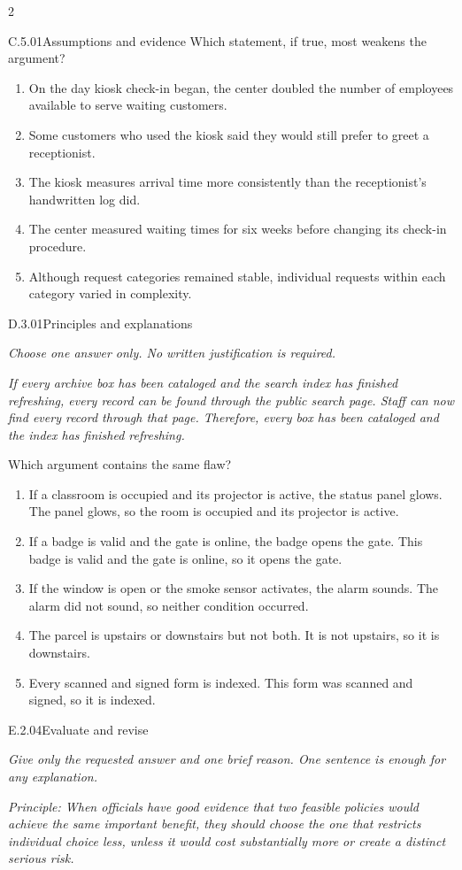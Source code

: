 \documentclass[9pt]{extarticle}
\newcommand{\choice}[1]{\item #1}
\begin{document}
\begin{multicols}{2}
\begin{DenseCoreProblem}{C.5.01}{Assumptions and evidence}
Which statement, if true, most weakens the argument?
\begin{enumerate}[label=(\alph*)]
  \choice{On the day kiosk check-in began, the center doubled the number of employees available to serve waiting customers.}
  \choice{Some customers who used the kiosk said they would still prefer to greet a receptionist.}
  \choice{The kiosk measures arrival time more consistently than the receptionist's handwritten log did.}
  \choice{The center measured waiting times for six weeks before changing its check-in procedure.}
  \choice{Although request categories remained stable, individual requests within each category varied in complexity.}
\end{enumerate}
\end{DenseCoreProblem}
\begin{DenseCoreProblem}{D.3.01}{Principles and explanations}
{\scriptsize\textit{Choose one answer only. No written justification is required.}\par}
\emph{If every archive box has been cataloged and the search index has finished refreshing, every record can be found through the public search page. Staff can now find every record through that page. Therefore, every box has been cataloged and the index has finished refreshing.}

Which argument contains the same flaw?
\begin{enumerate}[label=(\alph*)]
  \choice{If a classroom is occupied and its projector is active, the status panel glows. The panel glows, so the room is occupied and its projector is active.}
  \choice{If a badge is valid and the gate is online, the badge opens the gate. This badge is valid and the gate is online, so it opens the gate.}
  \choice{If the window is open or the smoke sensor activates, the alarm sounds. The alarm did not sound, so neither condition occurred.}
  \choice{The parcel is upstairs or downstairs but not both. It is not upstairs, so it is downstairs.}
  \choice{Every scanned and signed form is indexed. This form was scanned and signed, so it is indexed.}
\end{enumerate}
\end{DenseCoreProblem}
\begin{DenseCoreProblem}{E.2.04}{Evaluate and revise}
{\scriptsize\textit{Give only the requested answer and one brief reason. One sentence is enough for any explanation.}\par}
\emph{Principle: When officials have good evidence that two feasible policies would achieve the same important benefit, they should choose the one that restricts individual choice less, unless it would cost substantially more or create a distinct serious risk.}


\end{DenseCoreProblem}
\end{multicols}
\end{document}
